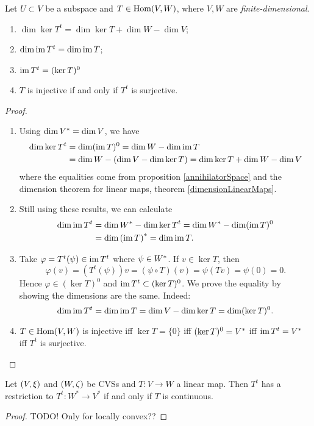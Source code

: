\begin{proposition}
Let $U\subset V$ be a subspace and $T\in \operatorname{Hom}(V,W)$, where $V,W$ are \emph{finite-dimensional}.
\begin{enumerate}
\item $\dim\ker T^t = \dim \ker T + \dim W - \dim V$;
\item $\dim\operatorname{im} T^t = \dim \operatorname{im} T$;
\item $\operatorname{im} T^t = (\ker T)^0$
\item $T$ is injective \textup{if and only if} $T^t$ is surjective.
\end{enumerate}
\end{proposition}
\begin{proof}
\mbox{}
\begin{enumerate}
\item Using $\dim {V}^* = \dim V$, we have
\begin{align*}
\dim \ker T^t &= \dim(\operatorname{im} T)^0 = \dim W-\dim \operatorname{im} T \\
&= \dim W - (\dim V - \dim \ker T) = \dim \ker T + \dim W - \dim V
\end{align*}
where the equalities come from proposition \ref{annihilatorSpace} and the dimension theorem for linear maps, theorem \ref{dimensionLinearMaps}.
\item Still using these results, we can calculate
\begin{align*}
\dim \operatorname{im} T^t &= \dim {W}^* - \dim \ker T^t = \dim {W}^* - \dim (\operatorname{im} T)^0 \\
&= \dim {(\operatorname{im}T)}^* = \dim \operatorname{im} T.
\end{align*}
\item Take $\varphi = T^t(\psi) \in \operatorname{im} T^t$ where $\psi \in {W}^*$. If $v\in \ker T$, then
\[ \varphi(v) = \left(T^t(\psi)\right)v = (\psi\circ T)(v) = \psi(Tv) = \psi(0) = 0. \]
Hence $\varphi \in (\ker T)^0$ and $\operatorname{im} T^t\subset (\ker T)^0$. We prove the equality by showing the dimensions are the same. Indeed:
\[ \dim \operatorname{im} T^t = \dim \operatorname{im} T = \dim V - \dim \ker T = \dim(\ker T)^0. \]
\item $T\in\operatorname{Hom}(V,W)$ is injective iff $\ker T = \{0\}$ iff $(\ker T)^0 = {V}^*$ iff $\operatorname{im} T^t = {V}^*$ iff $T^t$ is surjective.
\end{enumerate}
\end{proof}

\begin{proposition}
Let $\left( V,\xi \right)$ and $\left( W, \zeta \right)$ be CVSs and $T: V\to W$ a linear map. Then $T^t$ has a restriction to $T^t: W^* \to V^*$ \textup{if and only if} $T$ is continuous.
\end{proposition}
\begin{proof}
TODO! Only for locally convex??
\end{proof}

